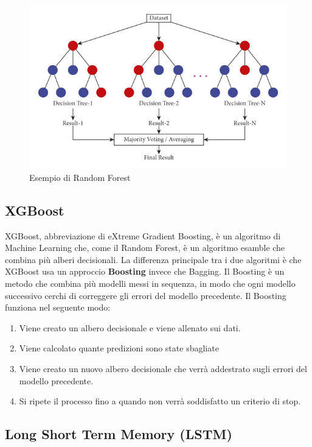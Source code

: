 \documentclass[12pt,a4paper,openright,twoside]{book}
\begin{document}
\begin{figure}
    \centering
    \includegraphics[width=.8\linewidth]{figures/Illustration-of-random-forest-trees.jpg}
    \caption{Esempio di Random Forest \cite{RFIMAGE}}
    \label{fig:random forest}
\end{figure}



\subsection{XGBoost}
XGBoost, abbreviazione di eXtreme Gradient Boosting, è un algoritmo di Machine Learning
che, come il Random Forest, è un algoritmo esamble che combina più alberi decisionali.
La differenza principale tra i due algoritmi è che XGBoost usa un approccio
\textbf{Boosting} invece che Bagging.
Il Boosting è un metodo che combina più modelli
messi in sequenza, in modo che ogni modello successivo
cerchi di correggere gli errori del modello precedente.
\cite{Xgboost2016}
Il Boosting funziona nel seguente modo:
\begin{enumerate}
    \item Viene creato un albero decisionale e viene allenato sui dati.
    \item Viene calcolato quante predizioni sono state sbagliate
    \item Viene creato un nuovo albero decisionale che verrà addestrato sugli errori del modello precedente.
    \item Si ripete il processo fino a quando non verrà soddisfatto un criterio di stop.
\end{enumerate}





\subsection{Long Short Term Memory (LSTM)}
\end{document}

